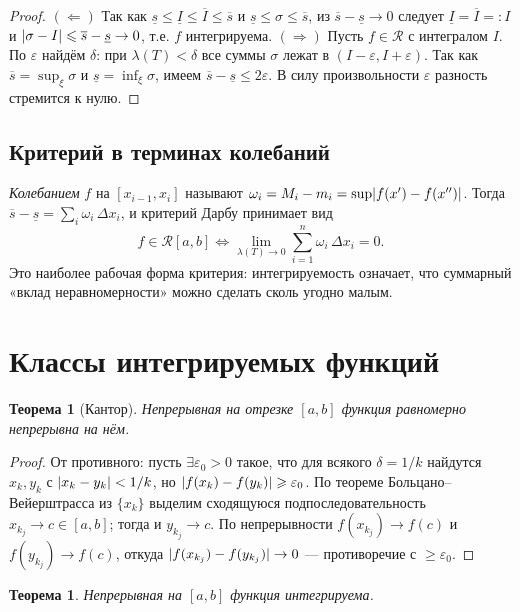 \documentclass[11pt,a4paper]{article}
\theoremstyle{definition}
\theoremstyle{plain}
\newtheorem{theorem}[definition]{Теорема}
\newcommand{\eps}{\varepsilon}
\renewcommand{\le}{\leqslant}
\renewcommand{\ge}{\geqslant}
\DeclarePairedDelimiter{\abs}{\lvert}{\rvert}
\begin{document}
\begin{proof}
$(\Leftarrow)$ Так как $\underline s\le\underline I\le\overline I\le\overline s$ и
$\underline s\le\sigma\le\overline s$, из $\overline s-\underline s\to0$ следует
$\underline I=\overline I=:I$ и $\abs{\sigma-I}\le\overline s-\underline s\to0$, т.е. $f$
интегрируема. $(\Rightarrow)$ Пусть $f\in\mathcal R$ с интегралом $I$. По $\eps$ найдём $\delta$:
при $\lambda(T)<\delta$ все суммы $\sigma$ лежат в $(I-\eps,I+\eps)$. Так как
$\overline s=\sup_\xi\sigma$ и $\underline s=\inf_\xi\sigma$, имеем
$\overline s-\underline s\le 2\eps$. В силу произвольности $\eps$ разность стремится к нулю.
\end{proof}

\subsection{Критерий в терминах колебаний}

\emph{Колебанием} $f$ на $[x_{i-1},x_i]$ называют $\omega_i=M_i-m_i=\sup\abs{f(x')-f(x'')}$. Тогда
$\overline s-\underline s=\sum_i\omega_i\,\Delta x_i$, и критерий Дарбу принимает вид
\[
  f\in\mathcal R[a,b]\iff \lim_{\lambda(T)\to0}\sum_{i=1}^n \omega_i\,\Delta x_i=0 .
\]
Это наиболее рабочая форма критерия: интегрируемость означает, что суммарный «вклад
неравномерности» можно сделать сколь угодно малым.

\section{Классы интегрируемых функций}

\begin{theorem}[Кантор]
Непрерывная на отрезке $[a,b]$ функция равномерно непрерывна на нём.
\end{theorem}

\begin{proof}
От противного: пусть $\exists\eps_0>0$ такое, что для всякого $\delta=1/k$ найдутся
$x_k,y_k$ с $\abs{x_k-y_k}<1/k$, но $\abs{f(x_k)-f(y_k)}\ge\eps_0$. По теореме
Больцано–Вейерштрасса из $\{x_k\}$ выделим сходящуюся подпоследовательность $x_{k_j}\to c\in[a,b]$;
тогда и $y_{k_j}\to c$. По непрерывности $f(x_{k_j})\to f(c)$ и $f(y_{k_j})\to f(c)$, откуда
$\abs{f(x_{k_j})-f(y_{k_j})}\to0$ — противоречие с $\ge\eps_0$.
\end{proof}

\begin{theorem}
Непрерывная на $[a,b]$ функция интегрируема.
\end{theorem}
\end{document}
